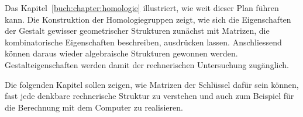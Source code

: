 Das Kapitel~\ref{buch:chapter:homologie} illustriert, wie weit dieser
Plan führen kann.
Die Konstruktion der Homologiegruppen zeigt, wie sich die Eigenschaften
der Gestalt gewisser geometrischer Strukturen zunächst mit Matrizen,
die kombinatorische Eigenschaften beschreiben, ausdrücken lassen.
Anschliessend können daraus wieder algebraische Strukturen gewonnen
werden.
Gestalteigenschaften werden damit der rechnerischen Untersuchung zugänglich.

Die folgenden Kapitel sollen zeigen, wie Matrizen der Schlüssel dafür
sein können, fast jede denkbare rechnerische Struktur zu verstehen und
auch zum Beispiel für die Berechnung mit dem Computer zu realisieren.




